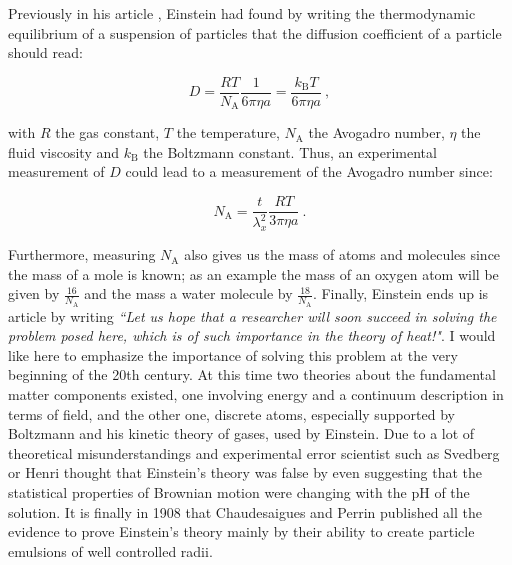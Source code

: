 Previously in his article \cite{einstein_uber_1905}, Einstein had found by writing the thermodynamic equilibrium of a suspension of particles that the diffusion coefficient of a particle should read:

\begin{equation}
	D = \frac{R T}{N_\mathrm{A}}\frac{1}{6\pi \eta a} = \frac{k_\mathrm{B}T}{6 \pi \eta a}
~,
	\label{Eq:D_einstein}
\end{equation}


with $R$ the gas constant, $T$ the temperature, $N_\mathrm{A}$ the Avogadro number, $\eta$ the fluid viscosity and $k_\mathrm{B}$ the Boltzmann constant. Thus, an experimental measurement of $D$ could lead to a measurement of the Avogadro number since:

\begin{equation}
	N_\mathrm{A} = \frac{t}{\lambda_x^2} \frac{RT}{3\pi \eta a} ~.
\end{equation}

Furthermore, measuring $N_\mathrm{A}$ also gives us the mass of atoms and molecules since the mass of a mole is known; as an example the mass of an oxygen atom will be given by $\frac{16}{N_\mathrm{A}}$ and the mass a water molecule by $\frac{18}{N_\mathrm{A}}$. Finally, Einstein ends up is article \cite{einstein_uber_1905} by writing \textit{``Let us hope that a researcher will soon succeed in solving the problem posed here, which is of such importance in the theory of heat!"}. I would like here to emphasize the importance of solving this problem at the very beginning of the 20th century. At this time two theories about the fundamental matter components existed, one involving energy and a continuum description in terms of field, and the other one, discrete atoms, especially supported by Boltzmann and his kinetic theory of gases, used by Einstein. Due to a lot of theoretical misunderstandings and experimental error scientist such as Svedberg or Henri thought that Einstein's theory was false \cite{genthon_concept_2020} by even suggesting that the statistical properties of Brownian motion were changing with the pH of the solution. It is finally in 1908 that Chaudesaigues and Perrin published all the evidence to prove Einstein's theory mainly by their ability to create particle emulsions of well controlled radii. 

